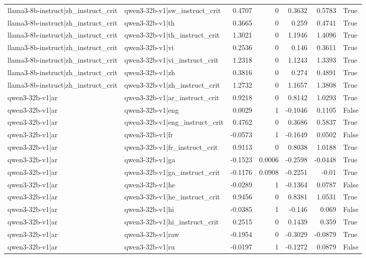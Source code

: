 \begin{table}
\begin{tabular}{l l r r r r l}
llama3-8b-instruct|zh_instruct_crit & qwen3-32b-v1|sw_instruct_crit & 0.4707 & 0 & 0.3632 & 0.5783 & True \\
llama3-8b-instruct|zh_instruct_crit & qwen3-32b-v1|th & 0.3665 & 0 & 0.259 & 0.4741 & True \\
llama3-8b-instruct|zh_instruct_crit & qwen3-32b-v1|th_instruct_crit & 1.3021 & 0 & 1.1946 & 1.4096 & True \\
llama3-8b-instruct|zh_instruct_crit & qwen3-32b-v1|vi & 0.2536 & 0 & 0.146 & 0.3611 & True \\
llama3-8b-instruct|zh_instruct_crit & qwen3-32b-v1|vi_instruct_crit & 1.2318 & 0 & 1.1243 & 1.3393 & True \\
llama3-8b-instruct|zh_instruct_crit & qwen3-32b-v1|zh & 0.3816 & 0 & 0.274 & 0.4891 & True \\
llama3-8b-instruct|zh_instruct_crit & qwen3-32b-v1|zh_instruct_crit & 1.2732 & 0 & 1.1657 & 1.3808 & True \\
qwen3-32b-v1|ar & qwen3-32b-v1|ar_instruct_crit & 0.9218 & 0 & 0.8142 & 1.0293 & True \\
qwen3-32b-v1|ar & qwen3-32b-v1|eng & 0.0029 & 1 & -0.1046 & 0.1105 & False \\
qwen3-32b-v1|ar & qwen3-32b-v1|eng_instruct_crit & 0.4762 & 0 & 0.3686 & 0.5837 & True \\
qwen3-32b-v1|ar & qwen3-32b-v1|fr & -0.0573 & 1 & -0.1649 & 0.0502 & False \\
qwen3-32b-v1|ar & qwen3-32b-v1|fr_instruct_crit & 0.9113 & 0 & 0.8038 & 1.0188 & True \\
qwen3-32b-v1|ar & qwen3-32b-v1|ga & -0.1523 & 0.0006 & -0.2598 & -0.0448 & True \\
qwen3-32b-v1|ar & qwen3-32b-v1|ga_instruct_crit & -0.1176 & 0.0908 & -0.2251 & -0.01 & True \\
qwen3-32b-v1|ar & qwen3-32b-v1|he & -0.0289 & 1 & -0.1364 & 0.0787 & False \\
qwen3-32b-v1|ar & qwen3-32b-v1|he_instruct_crit & 0.9456 & 0 & 0.8381 & 1.0531 & True \\
qwen3-32b-v1|ar & qwen3-32b-v1|hi & -0.0385 & 1 & -0.146 & 0.069 & False \\
qwen3-32b-v1|ar & qwen3-32b-v1|hi_instruct_crit & 0.2515 & 0 & 0.1439 & 0.359 & True \\
qwen3-32b-v1|ar & qwen3-32b-v1|raw & -0.1954 & 0 & -0.3029 & -0.0879 & True \\
qwen3-32b-v1|ar & qwen3-32b-v1|ru & -0.0197 & 1 & -0.1272 & 0.0879 & False \\

\end{tabular}
\end{table}
